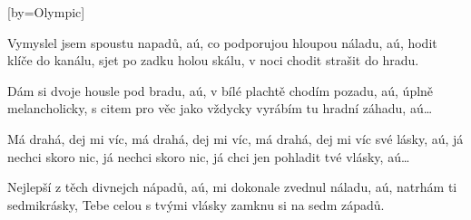 [by={Olympic}]

\beginverse{}
Vymyslel jsem spoustu napadů, aú,
co podporujou hloupou náladu, aú,
hodit klíče do kanálu, sjet po zadku holou skálu,
v noci chodit strašit do hradu.
\endverse{}

\beginverse{}
Dám si dvoje housle pod bradu, aú,
v bílé plachtě chodím pozadu, aú,
úplně melancholicky, s citem pro věc jako vždycky
vyrábím tu hradní záhadu, aú\ldots{}
\endverse{}

\beginchorus{}
Má drahá, dej mi víc, má drahá, dej mi víc,
má drahá, dej mi víc své lásky, aú,
já nechci skoro nic, já nechci skoro nic,
já chci jen pohladit tvé vlásky, aú\ldots{}
\endchorus{}

\beginverse{}
Nejlepší z těch divnejch nápadů, aú,
mi dokonale zvednul náladu, aú,
natrhám ti sedmikrásky, Tebe celou s tvými vlásky
zamknu si na sedm západů. 
\endverse{}

\endsong{}
